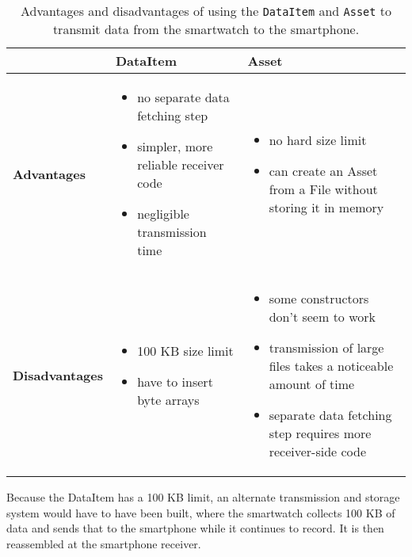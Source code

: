       \begin{table}
        \centering
        {\tabulinesep=1.2mm
        \begin{tabu} to \linewidth { X[2,c,m] | X[3,l,m] | X[3,l,m] | }
          & \textbf{DataItem} & \textbf{Asset} \\
          \hline
          \textbf{Advantages} & 
            \begin{itemize}
              \item no separate data fetching step
              \item simpler, more reliable receiver code
              \item negligible transmission time
            \end{itemize} &
            \begin{itemize}
              \item no hard size limit
              \item can create an Asset from a File without storing it in memory
            \end{itemize} \\
          \hline
          \textbf{Disadvantages} &
            \begin{itemize}
              \item 100 KB size limit
              \item have to insert byte arrays
            \end{itemize} &
            \begin{itemize}
              \item some constructors don't seem to work
              \item transmission of large files takes a noticeable amount of time
              \item separate data fetching step requires more receiver-side code
            \end{itemize} \\
          \hline
        \end{tabu}}
        \caption[Comparison of \texttt{DataItem} and \texttt{Asset}]{Advantages and disadvantages of using the \texttt{DataItem} and \texttt{Asset} to transmit data from the smartwatch to the smartphone.}
        \label{tab:dataitem-vs-asset}
      \end{table}
      
      Because the DataItem has a 100 KB limit, an alternate transmission and storage system would have to have been built, where the smartwatch collects 100 KB of data and sends that to the smartphone while it continues to record. It is then reassembled at the smartphone receiver.
      
